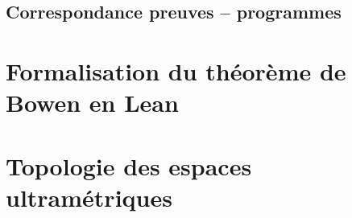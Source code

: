 \documentclass[a4paper, 11pt, twoside]{article}
\begin{document}
    \subsection{Correspondance preuves -- programmes}
      

  \newpage
  \section{Formalisation du théorème de Bowen en Lean}
    

  \newpage
  \section{Topologie des espaces ultramétriques}
    

  \newpage
  \nocite{*}
  \thispagestyle{plain}
  \printbibliography[heading=bibintoc, title={Bibliographie}]

  \clearpage
  

\end{document}
